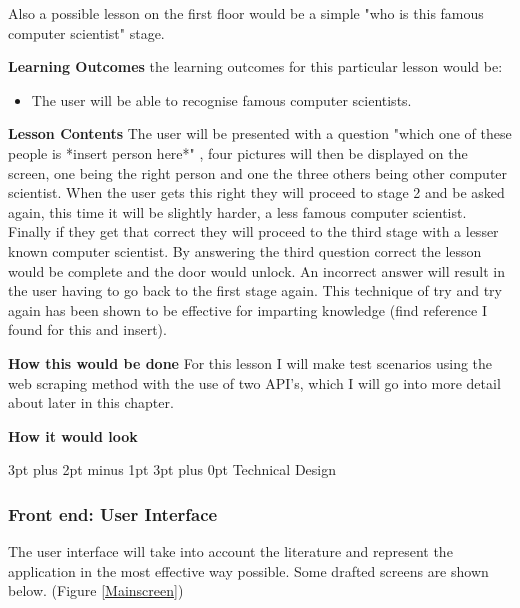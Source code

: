 \documentclass[12pt,a4paper]{article}
\makeatletter
\renewcommand\subsection{\@startsection {subsection}{1}{2mm} %
                               {3pt plus 2pt minus 1pt} %
                               {3pt plus 0pt} %
                               {\normalfont\bfseries}}
\makeatother
\begin{document}
Also a possible lesson on the first floor would be a simple "who is this famous computer scientist" stage.  

\textbf{Learning Outcomes} 
\newline the learning outcomes for this particular lesson would be:  

\begin{itemize}\itemsep0pt
	\item The user will be able to recognise famous computer scientists.
\end{itemize} 

\textbf{Lesson Contents} 
\newline The user will be presented with a question "which one of these people is *insert person here*" , four pictures will then be displayed on the screen, one being the right person and one the three others being other computer scientist. When the user gets this right they will proceed to stage 2 and be asked again, this time it will be slightly harder, a less famous computer scientist. Finally if they get that correct they will proceed to the third stage with a lesser known computer scientist. By answering the third question correct the lesson would be complete and the door would unlock. An incorrect answer will result in the user having to go back to the first stage again. This technique of try and try again has been shown to be effective for imparting knowledge (find reference I found for this and insert). 

\textbf{How this would be done}  
\newline For this lesson I will make test scenarios using the web scraping method with the use of two API's, which I will go into more detail about later in this chapter.  

\textbf{How it would look} 
 



\subsection{Technical Design} 
\subsubsection{Front end: User Interface}  
The user interface will take into account the literature and represent the application in the most effective way possible. Some drafted screens are shown below.  (Figure \ref{Mainscreen})
\end{document}
